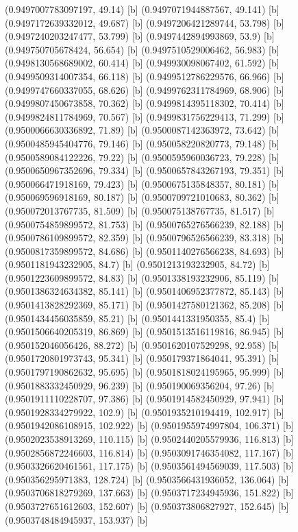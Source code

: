 {{{(0.9497007783097197, 49.14) [b] 
(0.9497071944887567, 49.141) [b] 
(0.9497172639332012, 49.687) [b] 
(0.9497206421289744, 53.798) [b] 
(0.9497240203247477, 53.799) [b] 
(0.9497442894993869, 53.9) [b] 
(0.949750705678424, 56.654) [b] 
(0.9497510529006462, 56.983) [b] 
(0.9498130568689002, 60.414) [b] 
(0.949930098067402, 61.592) [b] 
(0.9499509314007354, 66.118) [b] 
(0.9499512786229576, 66.966) [b] 
(0.9499747660337055, 68.626) [b] 
(0.9499762311784969, 68.906) [b] 
(0.9499807450673858, 70.362) [b] 
(0.9499814395118302, 70.414) [b] 
(0.9499824811784969, 70.567) [b] 
(0.9499831756229413, 71.299) [b] 
(0.9500066630336892, 71.89) [b] 
(0.9500087142363972, 73.642) [b] 
(0.9500485945404776, 79.146) [b] 
(0.950058220820773, 79.148) [b] 
(0.9500589084122226, 79.22) [b] 
(0.9500595960036723, 79.228) [b] 
(0.9500650967352696, 79.334) [b] 
(0.9500657843267193, 79.351) [b] 
(0.950066471918169, 79.423) [b] 
(0.9500675135848357, 80.181) [b] 
(0.950069596918169, 80.187) [b] 
(0.9500709721010683, 80.362) [b] 
(0.950072013767735, 81.509) [b] 
(0.950075138767735, 81.517) [b] 
(0.9500754859899572, 81.753) [b] 
(0.9500765276566239, 82.188) [b] 
(0.9500786109899572, 82.359) [b] 
(0.9500796526566239, 83.318) [b] 
(0.9500817359899572, 84.686) [b] 
(0.9501140276566238, 84.693) [b] 
(0.9501181943232905, 84.7) [b] 
(0.9501213193232905, 84.72) [b] 
(0.9501223609899572, 84.83) [b] 
(0.9501338193232906, 85.119) [b] 
(0.9501386324634382, 85.141) [b] 
(0.9501406952377872, 85.143) [b] 
(0.9501413828292369, 85.171) [b] 
(0.9501427580121362, 85.208) [b] 
(0.9501434456035859, 85.21) [b] 
(0.9501441331950355, 85.4) [b] 
(0.9501506640205319, 86.869) [b] 
(0.9501513516119816, 86.945) [b] 
(0.950152046056426, 88.272) [b] 
(0.9501620107529298, 92.958) [b] 
(0.9501720801973743, 95.341) [b] 
(0.950179371864041, 95.391) [b] 
(0.9501797190862632, 95.695) [b] 
(0.9501818024195965, 95.999) [b] 
(0.9501883332450929, 96.239) [b] 
(0.950190069356204, 97.26) [b] 
(0.9501911110228707, 97.386) [b] 
(0.9501914582450929, 97.941) [b] 
(0.9501928334279922, 102.9) [b] 
(0.9501935210194419, 102.917) [b] 
(0.9501942086108915, 102.922) [b] 
(0.9501955974997804, 106.371) [b] 
(0.9502023538913269, 110.115) [b] 
(0.9502440205579936, 116.813) [b] 
(0.9502856872246603, 116.814) [b] 
(0.9503091746354082, 117.167) [b] 
(0.9503326620461561, 117.175) [b] 
(0.9503561494569039, 117.503) [b] 
(0.950356295971383, 128.724) [b] 
(0.9503566431936052, 136.064) [b] 
(0.9503706818279269, 137.663) [b] 
(0.9503717234945936, 151.822) [b] 
(0.9503727651612603, 152.607) [b] 
(0.950373806827927, 152.645) [b] 
(0.9503748484945937, 153.937) [b] 
}}}
